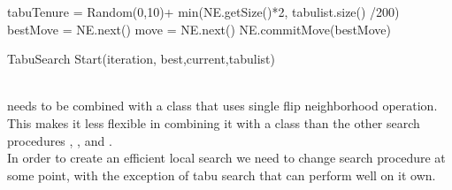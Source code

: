 \begin{algorithm}[H]

  \algdata
{}
\BlankLine
\int tabuTenure = Random(0,10)+ min(NE.getSize()*2, tabulist.size() /200) \;
 bestMove = NE.next() \;
 move = NE.next() \;
NE.commitMove(bestMove) \;

\caption{TabuSearch Start(iteration, best,current,tabulist)} \label{algo_TS} 
\end{algorithm} \noindent
\DecMargin{1em} \\
 needs to be combined with a  class that uses single flip neighborhood operation. 
This makes it less flexible in combining it with a  class than the other search procedures 
, , and . \\ 
In order to create an efficient local search we need to change search procedure at some point, with the exception of 
tabu search that can perform well on it own. 



